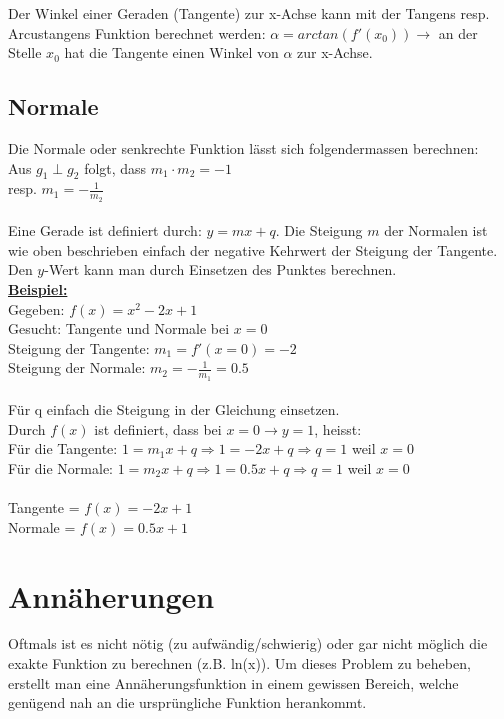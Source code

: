 \documentclass[12pt]{scrartcl}
\begin{document}
\noindent
Der Winkel einer Geraden (Tangente) zur x-Achse kann mit der Tangens resp. Arcustangens 
Funktion berechnet werden: $\alpha = arctan(f'(x_0)) \rightarrow$ an der Stelle 
$x_0$ hat die Tangente einen Winkel von $\alpha$ zur x-Achse.


\subsection{Normale}
Die Normale oder senkrechte Funktion lässt sich folgendermassen berechnen:\\
Aus  $g_1 \perp g_2  $ folgt, dass $m_1 \cdot m_2 = -1$ \\ 
resp. $m_1 = -\frac{1}{m_2}$ \\
\\ 
\noindent
Eine Gerade ist definiert durch: $y = mx + q$. Die Steigung $m$ der Normalen ist wie oben
beschrieben einfach der negative Kehrwert der Steigung der Tangente. Den $y$-Wert 
kann man durch Einsetzen des Punktes berechnen. \\

\noindent
\underline{\textbf{Beispiel:}} \\
Gegeben: $f(x) = x^2 -2x + 1$ \\ %
Gesucht: Tangente und Normale bei $x=0$\\
Steigung der Tangente: $m_1 = f'(x=0) = -2$ \\
Steigung der Normale: $m_2 = -\frac{1}{m_1} = 0.5$ \\
\\
Für q einfach die Steigung in der Gleichung einsetzen.\\
Durch $f(x)$ ist definiert, dass bei $x=0 \rightarrow y=1$, heisst:\\
Für die Tangente: $1 = m_1x + q \Rightarrow 1= -2x + q \Rightarrow q = 1$ weil $x=0$\\
Für die Normale: $1 = m_2x + q \Rightarrow 1= 0.5x + q \Rightarrow q = 1$ weil $x=0$\\
\\
\noindent
Tangente = \underline{$f(x) = -2x + 1$}\\
Normale = \underline{$f(x) = 0.5x + 1$}\\

\newpage
\section{Annäherungen} \label{approximation}
Oftmals ist es nicht nötig (zu aufwändig/schwierig) oder gar nicht möglich die exakte 
Funktion zu berechnen (z.B. ln(x)). Um dieses Problem zu beheben, erstellt man eine Annäherungsfunktion
in einem gewissen Bereich, welche genügend nah an die ursprüngliche Funktion herankommt.
\end{document}
